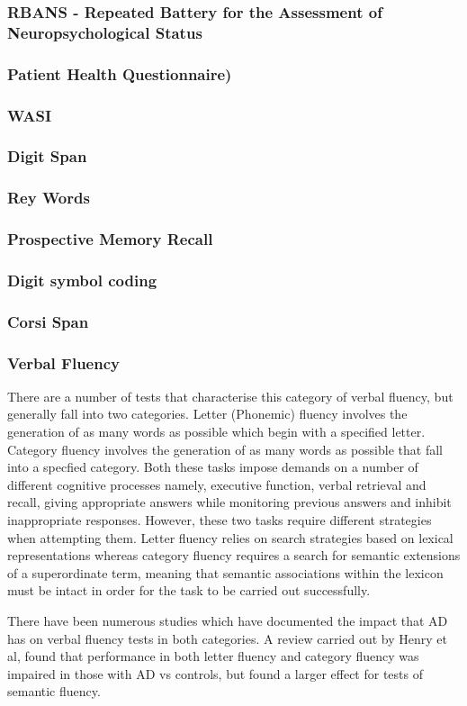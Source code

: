 \documentclass{article}
\begin{document}
\subsubsection{RBANS - Repeated Battery for the Assessment of Neuropsychological Status}
\subsubsection{Patient Health Questionnaire)}
\subsubsection{WASI}
\subsubsection{Digit Span}
\subsubsection{Rey Words}
\subsubsection{Prospective Memory Recall}
\subsubsection{Digit symbol coding}
\subsubsection{Corsi Span}
\subsubsection{Verbal Fluency}
There are a number of tests that characterise this category of verbal fluency, but generally fall into two categories. Letter (Phonemic) fluency involves the generation of as many words as possible which begin with a specified letter. Category fluency involves the generation of as many words as possible that fall into a specfied category. Both these tasks impose demands on a number of different cognitive processes namely, executive function, verbal retrieval and recall, giving appropriate answers while monitoring previous answers and inhibit inappropriate responses. However, these two tasks require different strategies when attempting them. Letter fluency relies on search strategies based on lexical representations whereas category fluency requires a search for semantic extensions of a superordinate term, meaning that semantic associations within the lexicon must be intact in order for the task to be carried out successfully. \par  
There have been numerous studies which have documented the impact that AD has on verbal fluency tests in both categories. A review carried out by Henry et al, found that performance in both letter fluency and category fluency was impaired in those with AD vs controls, but found a larger effect for tests of semantic fluency.
\end{document}
